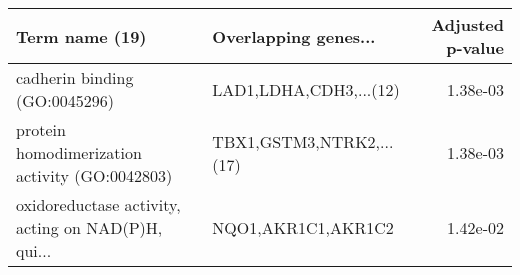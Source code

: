 \begin{tabular}{llr}
\toprule
                                    Term name (19) &     Overlapping genes... &  Adjusted p-value \\
\midrule
                     cadherin binding (GO:0045296) &   LAD1,LDHA,CDH3,...(12) &          1.38e-03 \\
    protein homodimerization activity (GO:0042803) & TBX1,GSTM3,NTRK2,...(17) &          1.38e-03 \\
oxidoreductase activity, acting on NAD(P)H, qui... &       NQO1,AKR1C1,AKR1C2 &          1.42e-02 \\
\bottomrule
\end{tabular}
